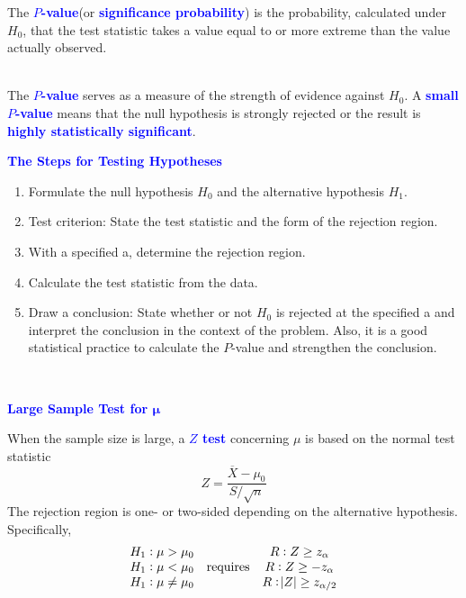 \documentclass[12pt,a4paper]{article}
\begin{document}
\begin{tcolorbox}[colback=white]
	The \textcolor{blue}{\bf $P$-value}(or \textcolor{blue}{\bf significance probability}) is the probability, calculated under $H_0$, that the test statistic takes a value equal to or more extreme than the value actually observed.
\end{tcolorbox}\
\\ The \textcolor{blue}{\bf $P$-value} serves as a measure of the strength of evidence against $H_0$. A \textcolor{blue}{\bf small $P$-value} means that the null hypothesis is strongly rejected or the result is \textcolor{blue}{\bf highly statistically significant}.

\begin{tcolorbox}[colback=white]\begin{center}
		\textcolor{blue}{\bf The Steps for Testing Hypotheses}
	\end{center} \begin{enumerate}
	\item Formulate the null hypothesis $H_0$ and the alternative hypothesis $H_1$.
	\item Test criterion: State the test statistic and the form of the rejection region.
	\item With a specified a, determine the rejection region.
	\item Calculate the test statistic from the data.
	\item Draw a conclusion: State whether or not $H_0$ is rejected at the specified a and interpret the conclusion in the context of the problem. Also, it is a good statistical practice to calculate the $P$-value and strengthen the conclusion.
\end{enumerate}
\end{tcolorbox}
\
\begin{tcolorbox}[colback=white]\begin{center}
	\textcolor{blue}{\bf Large Sample Test for $\boldsymbol{\mu}$}
\end{center} When the sample size is large, a \textcolor{blue}{\bf $Z$ test} concerning $\mu$ is based on the normal test statistic \[
Z=\frac{\overline{X}-\mu_0}{S/\sqrt{n}}
\] The rejection region is one- or two-sided depending on the alternative hypothesis. Specifically,
\[\begin{array}{ccc}
H_1: \mu>\mu_0 && R:Z\geq z_\alpha \\
H_1: \mu<\mu_0 &\text{requires}& R:Z\geq -z_\alpha \\
H_1: \mu\neq\mu_0 && R:\abs{Z}\geq z_{\alpha/2}
\end{array}\]
\end{tcolorbox}
\end{document}

